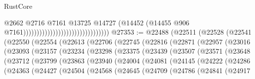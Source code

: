 \begin{lexlean}{RustCore}
\begin{coremodule}
                                                                @2662
                                                                @2716
                                                                @7161
                                                                @13725
                                                                @14727
                                                                (@14452
                                                                  (@14455
                                                                    @906
                                                                    @7161))))))))))))))))))))))))))))))))
@27353 := @22488
    (@22511
      (@22528
        (@22541
          (@22550
            (@22554
              (@22613
                (@22706
                  (@22745
                    (@22816
                      (@22871
                        (@22957
                          (@23016
                            (@23093
                              (@23157
                                (@23234
                                  (@23298
                                    (@23375
                                      (@23439
                                        (@23507
                                          (@23571
                                            (@23648
                                              (@23712
                                                (@23799
                                                  (@23863
                                                    (@23940
                                                      (@24004
                                                        (@24081
                                                          (@24145
                                                            (@24222
                                                              (@24286
                                                                (@24363
                                                                  (@24427
                                                                    (@24504
                                                                      (@24568
                                                                        (@24645
                                                                          (@24709
                                                                            (@24786
                                                                              (@24841
                                                                                (@24917

\end{coremodule}
\end{lexlean}
